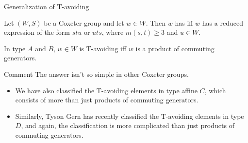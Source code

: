 \documentclass[9pt]{beamer}
\begin{document}
\begin{frame}{Generalization of T-avoiding}

\begin{definition}
Let $(W,S)$ be a Coxeter group and let $w\in W$. Then $w$ has  iff $w$ has a reduced expression of the form $stu$ or $uts$, where $m(s,t)\geq 3$ and $u\in W$.
\end{definition}

\begin{theorem}[CEGKM]
In type $A$ and $B$, $w\in W$ is T-avoiding iff $w$ is a product of commuting generators.
\end{theorem}

\begin{block}{Comment}
The answer isn't so simple in other Coxeter groups.
\begin{itemize}
\item We have also classified the T-avoiding elements in type affine $C$, which consists of more than just products of commuting generators.

\item Similarly, Tyson Gern has recently classified the T-avoiding elements in type $D$, and again, the classification is more complicated than just products of commuting generators.

\end{itemize}
\end{block}

\end{frame}
\end{document}
